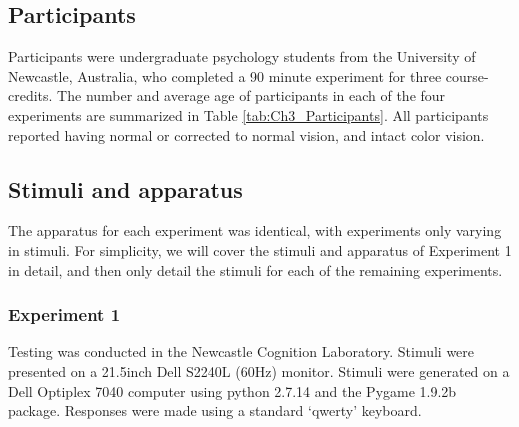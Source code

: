 \subsection{Participants}
Participants were undergraduate psychology students from the University of Newcastle, Australia, who completed a 90 minute experiment for three course-credits. The number and average age of participants in each of the four experiments are summarized in Table \ref{tab:Ch3_Participants}. All participants reported having normal or corrected to normal vision, and intact color vision.

\begin{table}[htb]
\centering
\caption{Summary table of participant number and mean age across experiments 1--4.}
\label{tab:Ch3_Participants}
\end{table}

\subsection{Stimuli and apparatus}
The apparatus for each experiment was identical, with experiments only varying in stimuli. For simplicity, we will cover the stimuli and apparatus of Experiment 1 in detail, and then only detail the stimuli for each of the remaining experiments.

\subsubsection{Experiment 1}
Testing was conducted in the Newcastle Cognition Laboratory. Stimuli were presented on a 21.5inch Dell S2240L (60Hz) monitor. Stimuli were generated on a Dell Optiplex 7040 computer using python 2.7.14 and the Pygame 1.9.2b package. Responses were made using a standard `qwerty' keyboard. 

